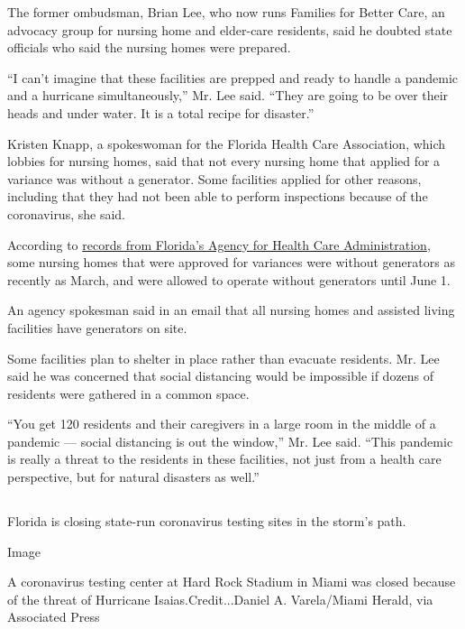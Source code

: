 The former ombudsman, Brian Lee, who now runs Families for Better Care,
an advocacy group for nursing home and elder-care residents, said he
doubted state officials who said the nursing homes were prepared.

``I can't imagine that these facilities are prepped and ready to handle
a pandemic and a hurricane simultaneously,'' Mr. Lee said. ``They are
going to be over their heads and under water. It is a total recipe for
disaster.''

Kristen Knapp, a spokeswoman for the Florida Health Care Association,
which lobbies for nursing homes, said that not every nursing home that
applied for a variance was without a generator. Some facilities applied
for other reasons, including that they had not been able to perform
inspections because of the coronavirus, she said.

According to
\href{http://apps.ahca.myflorida.com/dm_web/(S(1v0gkxzpdxlo2x3vtgyf1qxk))/doc_results_fo.aspx}{records
from Florida's Agency for Health Care Administration}, some nursing
homes that were approved for variances were without generators as
recently as March, and were allowed to operate without generators until
June 1.

An agency spokesman said in an email that all nursing homes and assisted
living facilities have generators on site.

Some facilities plan to shelter in place rather than evacuate residents.
Mr. Lee said he was concerned that social distancing would be impossible
if dozens of residents were gathered in a common space.

``You get 120 residents and their caregivers in a large room in the
middle of a pandemic --- social distancing is out the window,'' Mr. Lee
said. ``This pandemic is really a threat to the residents in these
facilities, not just from a health care perspective, but for natural
disasters as well.''

\hypertarget{-3}{%
\subsection{}\label{-3}}

Florida is closing state-run coronavirus testing sites in the storm's
path.

Image

A coronavirus testing center at Hard Rock Stadium in Miami was closed
because of the threat of Hurricane Isaias.Credit...Daniel A.
Varela/Miami Herald, via Associated Press

